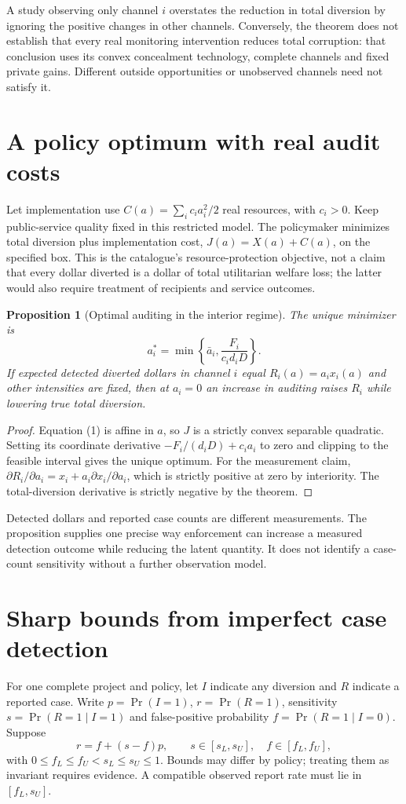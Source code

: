 \documentclass[11pt,a4paper]{article}
\newtheorem{proposition}[theorem]{Proposition}
\theoremstyle{definition}
\theoremstyle{remark}
\begin{document}
A study observing only channel $i$ overstates the reduction in total diversion by ignoring the positive changes in other channels. Conversely, the theorem does not establish that every real monitoring intervention reduces total corruption: that conclusion uses its convex concealment technology, complete channels and fixed private gains. Different outside opportunities or unobserved channels need not satisfy it.

\section{A policy optimum with real audit costs}
Let implementation use $C(a)=\sum_i c_i a_i^2/2$ real resources, with $c_i>0$. Keep public-service quality fixed in this restricted model. The policymaker minimizes total diversion plus implementation cost, $J(a)=X(a)+C(a)$, on the specified box. This is the catalogue's resource-protection objective, not a claim that every dollar diverted is a dollar of total utilitarian welfare loss; the latter would also require treatment of recipients and service outcomes.

\begin{proposition}[Optimal auditing in the interior regime]
The unique minimizer is
\[
 a_i^*=\min\left\{\bar a_i,\frac{F_i}{c_id_iD}\right\}.
\]
If expected detected diverted dollars in channel $i$ equal $R_i(a)=a_ix_i(a)$ and other intensities are fixed, then at $a_i=0$ an increase in auditing raises $R_i$ while lowering true total diversion.
\end{proposition}
\begin{proof}
Equation (1) is affine in $a$, so $J$ is a strictly convex separable quadratic. Setting its coordinate derivative $-F_i/(d_iD)+c_ia_i$ to zero and clipping to the feasible interval gives the unique optimum. For the measurement claim, $\partial R_i/\partial a_i=x_i+a_i\partial x_i/\partial a_i$, which is strictly positive at zero by interiority. The total-diversion derivative is strictly negative by the theorem.
\end{proof}

Detected dollars and reported case counts are different measurements. The proposition supplies one precise way enforcement can increase a measured detection outcome while reducing the latent quantity. It does not identify a case-count sensitivity without a further observation model.

\section{Sharp bounds from imperfect case detection}
For one complete project and policy, let $I$ indicate any diversion and $R$ indicate a reported case. Write $p=\Pr(I=1)$, $r=\Pr(R=1)$, sensitivity $s=\Pr(R=1\mid I=1)$ and false-positive probability $f=\Pr(R=1\mid I=0)$. Suppose
\[
 r=f+(s-f)p,\qquad s\in[s_L,s_U],\quad f\in[f_L,f_U],
\]
with $0\leq f_L\leq f_U<s_L\leq s_U\leq1$. Bounds may differ by policy; treating them as invariant requires evidence. A compatible observed report rate must lie in $[f_L,s_U]$.
\end{document}
